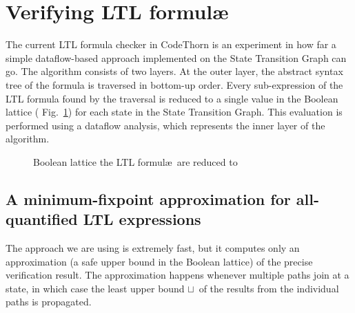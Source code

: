 \section{Verifying LTL formul\ae}

\newcommand{\ffalse}{\ensuremath{\mathit{false}}}
\newcommand{\ttrue}{\ensuremath{\mathit{true}}}

The current LTL formula checker in CodeThorn is an experiment in how
far a simple dataflow-based approach implemented on the State
Transition Graph can go. The algorithm consists of two layers. At the
outer layer, the abstract syntax tree of the formula is traversed in
bottom-up order. Every sub-expression of the LTL formula found by the
traversal is reduced to a single value in the Boolean lattice (\cf
Fig.~\ref{fig:bool_lattice}) for each state in the State Transition
Graph. This evaluation is performed using a dataflow analysis, which
represents the inner layer of the algorithm.

\begin{figure}
  \centering
  \caption{Boolean lattice the LTL formul\ae\ are reduced to}
  \label{fig:bool_lattice}
\end{figure}

\newcommand{\lub}{\ensuremath{\sqcup}\xspace}
\newcommand{\Lub}{\ensuremath{\bigsqcup}\xspace}
\newcommand{\state}{\ensuremath{\mathit{s}}\xspace}
\newcommand{\STG}{\ensuremath{\mathrm{STG}}\xspace}
\newcommand{\States}{\ensuremath{\mathit{States}}\xspace}
\newcommand{\prop}[1]{\ensuremath{p_{\state,#1}}\xspace} 
\newcommand{\propp}[1]{\ensuremath{p_{\state',#1}}\xspace} 
\newcommand{\G}{\ensuremath{\mathrm{G}}\xspace}
\newcommand{\F}{\ensuremath{\mathrm{F}}\xspace}
\newcommand{\X}{\ensuremath{\mathrm{X}}\xspace}
\newcommand{\R}{\ensuremath{\mathrm{R}}\xspace}
\newcommand{\U}{\ensuremath{\mathrm{U}}\xspace}
\newcommand{\WU}{\ensuremath{\mathrm{WU}\xspace}}
\newcommand{\comb}{\ensuremath{\mathit{succs}}\xspace}

\subsection{A minimum-fixpoint approximation for all-quantified LTL expressions}
The approach we are using is extremely fast, but it computes only an
approximation (a safe upper bound in the Boolean lattice) of the
precise verification result. The approximation happens whenever
multiple paths join at a state, in which case the least upper bound
\lub\ of the results from the individual paths is propagated.

